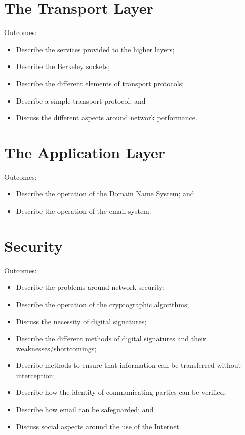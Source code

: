 \documentclass[a4paper, 12pt, titlepage]{report}
\begin{document}
\chapter{The Transport Layer}
Outcomes:
\begin{itemize}
\item Describe the services provided to the higher layers;
\item Describe the Berkeley sockets;
\item Describe the different elements of transport protocols;
\item Describe a simple transport protocol; and
\item Discuss the different aspects around network performance.
\end{itemize}
\chapter{The Application Layer}
Outcomes:
\begin{itemize}
\item Describe the operation of the Domain Name System; and
\item Describe the operation of the email system.
\end{itemize}
\chapter{Security}
Outcomes:
\begin{itemize}
\item Describe the problems around network security;
\item Describe the operation of the cryptographic algorithms;
\item Discuss the necessity of digital signatures;
\item Describe the different methods of digital signatures and their weaknesses/shortcomings;
\item Describe methods to ensure that information can be transferred without interception;
\item Describe how the identity of communicating parties can be verified;
\item Describe how email can be safeguarded; and
\item Discuss social aspects around the use of the Internet.
\end{itemize}
\end{document}
